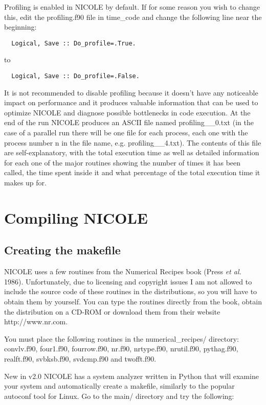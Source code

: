 Profiling is enabled in NICOLE by default. If for some reason you wish
to change this, edit the
profiling.f90 file in time\_code and change the following line near the
beginning:
\begin{verbatim}
  Logical, Save :: Do_profile=.True.
\end{verbatim}
to
\begin{verbatim}
  Logical, Save :: Do_profile=.False.
\end{verbatim}
It is not recommended to disable profiling because it doesn't have any
noticeable impact on performance and it produces valuable information
that can be used to optimize NICOLE and diagnose possible bottlenecks
in code execution. At the end of the run NICOLE produces an ASCII file 
named profiling\_\_0.txt (in the case of a parallel run there will be
one file for each process, each one with the process number n in the
file name, e.g. profiling\_\_4.txt). The contents of this file are
self-explanatory, with the total execution time as well as detailed 
information for each one of the major routines showing the number
of times it has been called, the time spent inside it and what
percentage of the total execution time it makes up for.

\chapter{Compiling NICOLE}

\section{Creating the makefile}
\label{sec:compiling}

 
NICOLE uses a few routines from the Numerical Recipes book (Press {\em
  et al.} 1986).  Unfortunately, due to licensing and copyright issues
I am not allowed to include the source code of these routines in the
distributions, so you will have to obtain them by yourself. You can
type the routines directly from the book, obtain the distribution on a
CD-ROM or download them from their website http://www.nr.com.

You must place the following routines in the numerical\_recipes/
directory: convlv.f90, four1.f90, fourrow.f90, nr.f90, nrtype.f90,
nrutil.f90, pythag.f90, realft.f90, svbksb.f90, svdcmp.f90 and
twofft.f90.

New in v2.0 NICOLE has a system analyzer written in Python that will
examine your system and automatically create a makefile, similarly to
the popular autoconf tool for Linux. Go to the main/ directory and try
the following:

